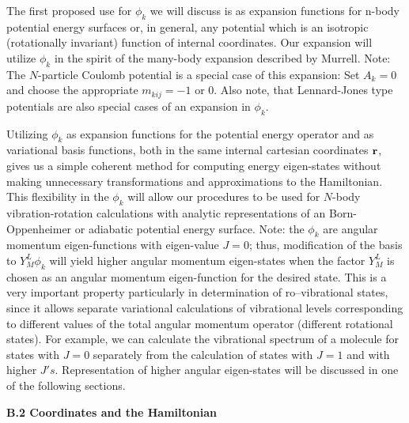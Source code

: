 The first proposed use for $\phi _k$ we will discuss is as expansion
functions for n-body potential energy surfaces or, in general, any potential
which is an isotropic 
(rotationally invariant)
function of internal coordinates. Our expansion will
utilize $\phi _k$ in the spirit of the many-body expansion described by
Murrell\cite{Murrell84}. Note: The $N$-particle 
Coulomb potential is a special
case of this expansion: Set $A_k=0$ and 
choose the appropriate $m_{kij}=-1$ or $0$. 
Also note, that Lennard-Jones type potentials are also special cases
of an expansion in $\phi _k.$

Utilizing $\phi _k$ as expansion functions for the potential energy operator
and as variational basis functions, both in the same 
internal cartesian coordinates $%
{\bf r}$, gives us a simple coherent method for computing energy
eigen-states without making unnecessary transformations and approximations to
the Hamiltonian. This flexibility in the $\phi _k$ will allow our procedures
to be used  
for $N$-body vibration-rotation calculations with
analytic representations of an Born-Oppenheimer or 
adiabatic potential energy surface.
Note: the $\phi _k$ are angular momentum eigen-functions
with eigen-value $J=0$; thus, modification of the basis to $Y_M^L\phi _k$
will yield higher angular momentum eigen-states when the factor $Y_M^L$ is
chosen as an angular momentum eigen-function for the desired state.
This is a very important property particularly in determination
of ro--vibrational states, since it allows separate variational
calculations of vibrational levels corresponding to different
values of the total angular momentum operator (different rotational states).
For example, we can calculate the vibrational spectrum of a 
molecule for states with $J=0$ separately from the calculation
of states with $J=1$ and with higher $J's$. 
Representation of higher angular eigen-states will be discussed in 
one of the following sections.



\vspace{2mm}
\noindent
{\bf B.2 Coordinates and the Hamiltonian}

